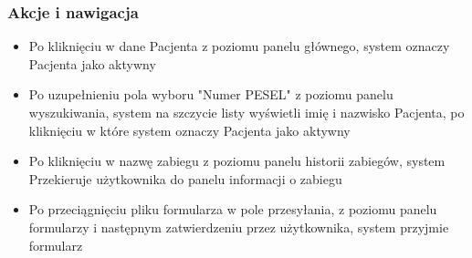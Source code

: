 \subsubsection{Akcje i nawigacja}
\begin{itemize}
    \item Po kliknięciu w dane Pacjenta z poziomu panelu głównego, system oznaczy Pacjenta jako aktywny
    \item Po uzupełnieniu pola wyboru "Numer PESEL" z poziomu panelu wyszukiwania, system na szczycie listy wyświetli imię i nazwisko Pacjenta, po kliknięciu w które system oznaczy Pacjenta jako aktywny
    \item Po kliknięciu w nazwę zabiegu z poziomu panelu historii zabiegów, system Przekieruje użytkownika do panelu informacji o zabiegu
    \item Po przeciągnięciu pliku formularza w pole przesyłania, z poziomu panelu formularzy i następnym zatwierdzeniu przez użytkownika, system przyjmie formularz
\end{itemize}